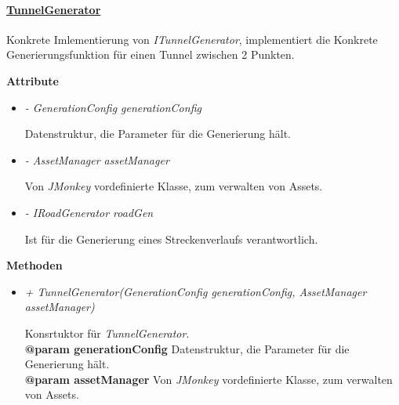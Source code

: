     
        \pagebreak
        \paragraph{\underline{TunnelGenerator}} \mbox{}\par
            Konkrete Imlementierung von \textit{ITunnelGenerator}, implementiert die Konkrete Generierungsfunktion für einen Tunnel
            zwischen 2 Punkten.\par
            
            \textbf{Attribute}
            \begin{itemize}
                \item  \textit{- GenerationConfig generationConfig} 
                    \begin{leftbar}[0.9\linewidth]
                        Datenstruktur, die Parameter für die Generierung hält.
                    \end{leftbar}
                
                \item  \textit{- AssetManager assetManager} 
                    \begin{leftbar}[0.9\linewidth]
                        Von \textit{JMonkey} vordefinierte Klasse, zum verwalten von Assets.
                    \end{leftbar}
                
                \item  \textit{- IRoadGenerator roadGen} 
                    \begin{leftbar}[0.9\linewidth]
                        Ist für die Generierung eines Streckenverlaufs verantwortlich.
                    \end{leftbar}
            \end{itemize}

            \textbf{Methoden}					
            \begin{itemize}
                \item  \textit{+ TunnelGenerator(GenerationConfig generationConfig, AssetManager assetManager)}
                    \begin{leftbar}[0.9\linewidth]
                        Konsrtuktor für \textit{TunnelGenerator}.\\
                        \textbf{@param generationConfig} Datenstruktur, die Parameter für die Generierung hält.\\
                        \textbf{@param assetManager}  Von \textit{JMonkey} vordefinierte Klasse, zum verwalten von Assets.
                    \end{leftbar} 
            \end{itemize}
    
